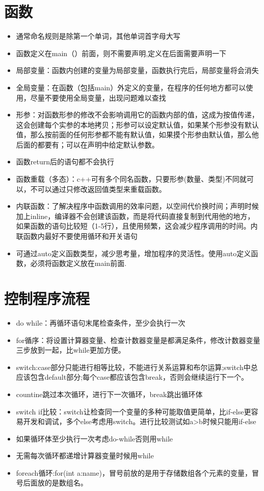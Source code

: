 \documentclass{article}
\begin{document}
\section{函数}
\begin{itemize}
\item 通常命名规则是除第一个单词，其他单词首字母大写
\item 函数定义在main（）前面，则不需要声明,定义在后面需要声明一下
\item 局部变量：函数内创建的变量为局部变量，函数执行完后，局部变量将会消失
\item 全局变量：在函数（包括main）外定义的变量，在程序的任何地方都可以使用，尽量不要使用全局变量，出现问题难以查找
\item 形参：对函数形参的修改不会影响调用它的函数内部的值，这成为{\red 按值传递}，这会创建每个实参的本地拷贝；形参可以设定默认值，如果某个形参没有默认值，那么按前面的任何形参都不能有默认值，如果摸个形参由默认值，那么他后面的都要有；可以在声明中给定默认参数。
\item 函数return后的语句都不会执行
\item 函数重载（多态）：c++可有多个同名函数，只要形参(数量、类型)不同就可以，不可以通过只修改返回值类型来重载函数。
\item 内联函数：了解决程序中函数调用的效率问题，以空间代价换时间；声明时候加上inline，编译器不会创建该函数，而是将代码直接复制到代用他的地方，如果函数的语句比较短（1-5行），且使用频繁，这会减少程序调用的时间。内联函数内最好不要使用循环和开关语句
\item 可通过auto定义函数类型，减少思考量，增加程序的灵活性。使用auto定义函数，必须将函数定义放在main前面.
\end{itemize}

\section{控制程序流程}
\begin{itemize}
\item do while：再循环语句末尾检查条件，至少会执行一次
\item for循序：将设置计算器变量、检查计数器变量是都满足条件，修改计数器变量三步放到一起，比while更加方便。
\item switch:case部分只能进行相等比较，不能进行关系运算和布尔运算;switch中总应该包含default部分;每个case都应该包含break，否则会继续运行下一个。
\item countine跳过本次循环，进行下一次循环，break跳出循环体
\item switch if比较：switch让检查同一个变量的多种可能取值更简单，比if-else更容易开发和调试，多个else考虑用switch。进行比较测试如a>b时候只能用if-else
\item 如果循环体至少执行一次考虑do-while否则用while
\item 无需每次循环都递增计算器变量时候用while
\item foreach循环:for(int a:name)，冒号前放的是用于存储数组各个元素的变量，冒号后面放的是数组名。
\end{itemize}
\end{document}
